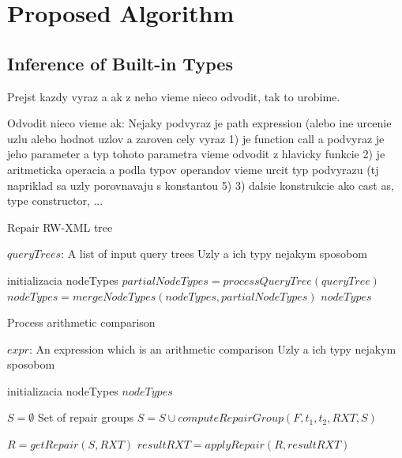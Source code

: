 \chapter{Proposed Algorithm}

\section{Inference of Built-in Types}
Prejst kazdy vyraz a ak z neho vieme nieco odvodit, tak to urobime.

Odvodit nieco vieme ak:
Nejaky podvyraz je path expression (alebo ine urcenie uzlu alebo hodnot uzlov 
a zaroven cely vyraz
1) je function call a podvyraz je jeho parameter a typ tohoto parametra vieme odvodit z hlavicky funkcie
2) je aritmeticka operacia a podla typov operandov vieme urcit typ podvyrazu (tj napriklad sa uzly porovnavaju s konstantou 5) 
3) dalsie konstrukcie ako cast as, type constructor, ... 



\begin{algorithm}
\caption{Repair RW-XML tree}
\label{propAlgo}
\begin{algorithmic}[1]
\REQUIRE $queryTrees$: A list of input query trees
\ENSURE Uzly a ich typy nejakym sposobom

\STATE initializacia nodeTypes
    \STATE $partialNodeTypes = processQueryTree(queryTree)$
    \STATE $nodeTypes = mergeNodeTypes(nodeTypes, partialNodeTypes)$
\ENDFOR
\RETURN $nodeTypes$
\end{algorithmic}
\end{algorithm}

\begin{algorithm}
\caption{Process arithmetic comparison}
\label{algorithm_process_arithmetic comparison}
\begin{algorithmic}[1]
\REQUIRE $expr$: An expression which is an arithmetic comparison
\ENSURE Uzly a ich typy nejakym sposobom

\STATE initializacia nodeTypes
\RETURN $nodeTypes$


    \STATE $S = \emptyset$ \COMMENT Set of repair groups
		    \STATE $S = S \cup computeRepairGroup(F, t_1, t_2, RXT, S)$
	    \ENDFOR
    \ENDFOR

    \STATE $R = getRepair(S, RXT)$
    \STATE $resultRXT = applyRepair(R, resultRXT)$
\ENDWHILE
\end{algorithmic}
\end{algorithm}